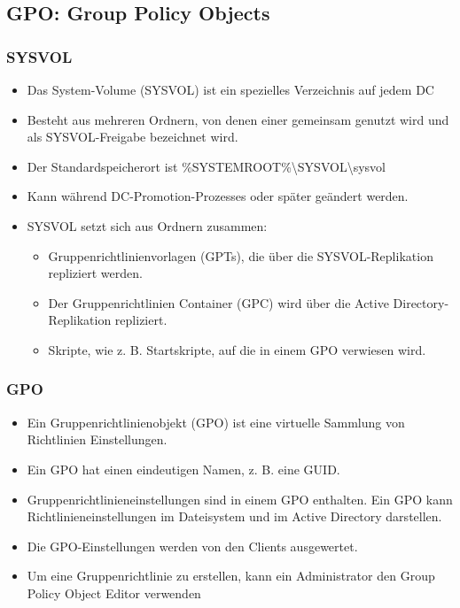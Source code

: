 \subsection{GPO: Group Policy Objects}

\subsubsection{SYSVOL}
\begin{itemize}
    \item Das System-Volume (SYSVOL) ist ein spezielles Verzeichnis auf jedem DC
    \item Besteht aus mehreren Ordnern, von denen einer gemeinsam genutzt wird und als SYSVOL-Freigabe bezeichnet wird.
    \item Der Standardspeicherort ist \%SYSTEMROOT\%\textbackslash SYSVOL\textbackslash sysvol
    \item Kann während DC-Promotion-Prozesses oder später geändert werden.
    \item SYSVOL setzt sich aus Ordnern zusammen:
    \begin{itemize}
        \item Gruppenrichtlinienvorlagen (GPTs), die über die SYSVOL-Replikation repliziert werden.
        \item Der Gruppenrichtlinien Container (GPC) wird über die Active Directory-Replikation repliziert.
        \item Skripte, wie z. B. Startskripte, auf die in einem GPO verwiesen wird.
    \end{itemize}
\end{itemize}

\subsubsection{GPO}
\begin{itemize}
    \item Ein Gruppenrichtlinienobjekt (GPO) ist eine virtuelle Sammlung von Richtlinien Einstellungen.
    \item Ein GPO hat einen eindeutigen Namen, z. B. eine GUID.
    \item Gruppenrichtlinieneinstellungen sind in einem GPO enthalten. Ein GPO kann Richtlinieneinstellungen im Dateisystem und im Active Directory darstellen.
    \item Die GPO-Einstellungen werden von den Clients ausgewertet.
    \item Um eine Gruppenrichtlinie zu erstellen, kann ein Administrator den Group Policy Object Editor verwenden
\end{itemize}

